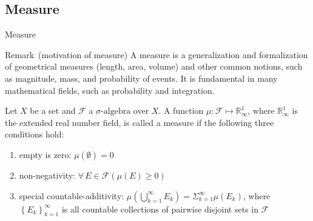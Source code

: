 \documentclass[utf-8, 10pt, aspectratio=1610]{beamer}
\begin{document}
\subsection{Measure}
\begin{frame}{Measure}
	\vspace*{\fill}
	\begin{block}{Remark\ (motivation of measure)}
		A measure is a generalization and formalization of geometrical measures (length, area, volume) and other common notions, such as magnitude, mass, and probability of events. It is fundamental in many mathematical fields, such as probability and integration.
	\end{block}
	\vspace*{\fill}
	\begin{definition}[measure]
		Let \(X\) be a set and \(\mathcal{F}\) a \(\sigma \text{-algebra} \) over \(X\). A function \(\mu:\mathcal{F}\mapsto \mathbb{R}_{\infty}^{1}\), where \(\mathbb{R}_{\infty}^{1}\) is the extended real number field, is called a measure if the following three conditions hold:
		\begin{enumerate}
			\item empty is zero: \(\mu \left(\emptyset\right) = 0\)
			\item non-negativity: \(\forall\, E \in \mathcal{F} \left( \mu\left(E\right) \geq 0 \right) \)
			\item special countable-additivity: \(\mu\left(\bigcup_{k=1}^{\infty} E_k\right) = \Sigma_{k=1}^{\infty} \mu \left(E_k\right)\), where \(\left\{E_k\right\}^{\infty}_{k=1} \) is all countable collections of pairwise disjoint sets in \(\mathcal{F}\)
		\end{enumerate}
	\end{definition}\label{def:measure}
	\vspace*{\fill}
\end{frame}
\end{document}
